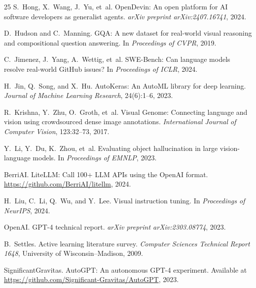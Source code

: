 \documentclass[11pt]{article}
\begin{document}
\begin{thebibliography}{25}
S.~Hong, X.~Wang, J.~Yu, et~al.
\newblock OpenDevin: An open platform for AI software developers as generalist agents.
\newblock \emph{arXiv preprint arXiv:2407.16741}, 2024.

D.~Hudson and C.~Manning.
\newblock GQA: A new dataset for real-world visual reasoning and compositional question answering.
\newblock In \emph{Proceedings of CVPR}, 2019.

C.~Jimenez, J.~Yang, A.~Wettig, et~al.
\newblock SWE-Bench: Can language models resolve real-world GitHub issues?
\newblock In \emph{Proceedings of ICLR}, 2024.

H.~Jin, Q.~Song, and X.~Hu.
\newblock AutoKeras: An AutoML library for deep learning.
\newblock \emph{Journal of Machine Learning Research}, 24(6):1--6, 2023.

R.~Krishna, Y.~Zhu, O.~Groth, et~al.
\newblock Visual Genome: Connecting language and vision using crowdsourced dense image annotations.
\newblock \emph{International Journal of Computer Vision}, 123:32--73, 2017.

Y.~Li, Y.~Du, K.~Zhou, et~al.
\newblock Evaluating object hallucination in large vision-language models.
\newblock In \emph{Proceedings of EMNLP}, 2023.

BerriAI.
\newblock LiteLLM: Call 100+ LLM APIs using the OpenAI format.
\newblock \url{https://github.com/BerriAI/litellm}, 2024.

H.~Liu, C.~Li, Q.~Wu, and Y.~Lee.
\newblock Visual instruction tuning.
\newblock In \emph{Proceedings of NeurIPS}, 2024.

OpenAI.
\newblock GPT-4 technical report.
\newblock \emph{arXiv preprint arXiv:2303.08774}, 2023.

B.~Settles.
\newblock Active learning literature survey.
\newblock \emph{Computer Sciences Technical Report 1648}, University of Wisconsin--Madison, 2009.

Significant\-Gravitas.
\newblock Auto{GPT}: An autonomous {GPT}-4 experiment.
\newblock Available at \url{https://github.com/Significant-Gravitas/AutoGPT}, 2023.


\end{thebibliography}
\end{document}
